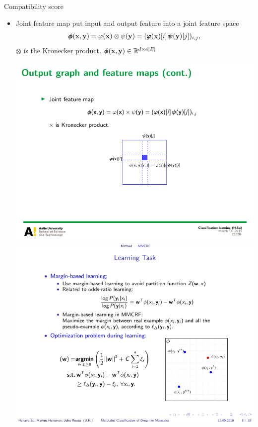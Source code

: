 \documentclass[first=dgreen,second=purple,logo=yellowexc]{aaltoslides}
\begin{document}
{\begin{frame}{Compatibility score}
	\begin{itemize}
		\item Joint feature map put input and output feature into a joint feature space
		\begin{align*}
			\pmb \phi(\mathbf {x},\mathbf {y}) = \varphi(\mathbf {x})\otimes\psi(\mathbf {y}) = (\pmb \varphi(\mathbf {x})[i]\,\pmb \psi(\mathbf {y})[j])_{i,j},
		\end{align*} 
			$\otimes$ is the Kronecker product. $\pmb \phi(\mathbf {x},\mathbf {y})\in\mathbb{R}^{d\times4|E|}$
		\begin{center}
			\includegraphics[scale = 1]{./figures/tensor_label.pdf}	
			\text{     }
			\includegraphics[scale = 0.7]{./figures/jointfeaturespace.pdf}	
		\end{center}

\end{itemize}
\end{frame}}
\end{document}
